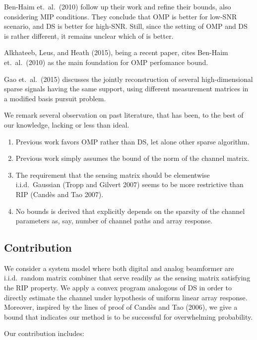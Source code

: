Ben-Haim et.\ al.\ (2010) follow up their work and refine their bounds, also considering MIP conditions.
They conclude that OMP is better for low-SNR scenario, and DS is better for high-SNR.
Still, since the setting of OMP and DS is rather different, it remains unclear which of is better.

Alkhateeb, Leus, and Heath (2015), being a recent paper, cites Ben-Haim et.\ al.\ (2010) as the main foundation for OMP perfomance bound.

Gao et.\ al.\ (2015) discusses the jointly reconstruction of several high-dimensional sparse signals having the same support, using different measurement matrices in a modified basis pursuit problem.

We remark several observation on past literature, that has been, to the best of our knowledge, lacking or less than ideal.

\begin{enumerate}
\item Previous work favors OMP rather than DS, let alone other sparse algorithm.
\item Previous work simply assumes the bound of the norm of the channel matrix.
\item The requirement that the sensing matrix should be elementwise i.i.d.\ Gaussian (Tropp and Gilvert 2007) seems to be more restrictive than RIP (Cand\`es and Tao 2007).
\item No bounds is derived that explicitly depends on the sparsity of the channel parameters as, say, number of channel paths and array response.
\end{enumerate}

\subsection{Contribution}

We consider a system model where both digital and analog beamformer are i.i.d.\ random matrix combiner that serve readily as the sensing matrix satisfying the RIP property.
We apply a convex program analogous of DS in order to directly estimate the channel under hypothesis of uniform linear array response.
Moreover, inspired by the lines of proof of Cand\`es and Tao (2006), we give a bound that indicates our method is to be successful for overwhelming probability.

Our contribution includes:

